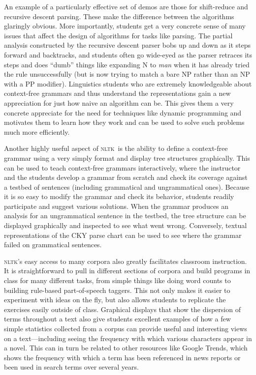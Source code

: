 \documentclass[11pt]{article}
\newcommand{\NLTK}{\textsc{nltk}}
\begin{document}
An example of a particularly effective set of demos are those for
shift-reduce and recursive descent parsing. These make the difference
between the algorithms glaringly obvious. More importantly, students
get a very concrete sense of many issues that affect the design of
algorithms for tasks like parsing. The partial analysis constructed by
the recursive descent parser bobs up and down as it steps forward and
backtracks, and students often go wide-eyed as the parser retraces its
steps and does ``dumb'' things like expanding N to {\it man} when it
has already tried the rule unsuccessfully (but is now trying to match
a bare NP rather than an NP with a PP modifier). Linguistics students
who are extremely knowledgeable about context-free grammars and thus
understand the representations gain a new appreciation for just how
naive an algorithm can be. This gives them a very concrete appreciate
for the need for techniques like dynamic programming and motivates
them to learn how they work and can be used to solve such problems
much more efficiently.

Another highly useful aspect of \NLTK\ is the ability to define a
context-free grammar using a very simply format and display tree
structures graphically. This can be used to teach context-free
grammars interactively, where the instructor and the students develop
a grammar from scratch and check its coverage against a testbed of
sentences (including grammatical and ungrammatical ones). Because it
is so easy to modify the grammar and check its behavior, students
readily participate and suggest various solutions. When the grammar
produces an analysis for an ungrammatical sentence in the testbed, the
tree structure can be displayed graphically and inspected to see what
went wrong. Conversely, textual representations of the CKY parse chart
can be used to see where the grammar failed on grammatical sentences.

\NLTK's easy access to many corpora also greatly facilitates classroom
instruction. It is straightforward to pull in different sections of
corpora and build programs in class for many different tasks, from
simple things like doing word counts to building rule-based
part-of-speech taggers. This not only makes it easier to experiment
with ideas on the fly, but also allows students to replicate the
exercises easily outside of class. Graphical displays that show the
dispersion of terms throughout a text also give students excellent
examples of how a few simple statistics collected from a corpus can
provide useful and interesting views on a text---including seeing the
frequency with which various characters appear in a novel. This can in
turn be related to other resources like Google Trends, which shows the
frequency with which a term has been referenced in news reports or
been used in search terms over several years.
\end{document}
